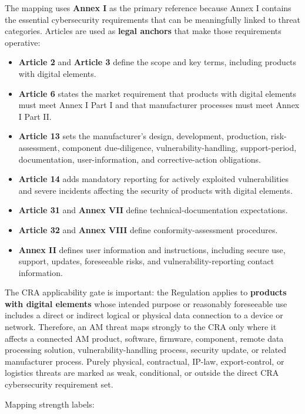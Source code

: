 \documentclass[10pt,a4paper,oneside]{report}
\begin{document}
The mapping uses \textbf{Annex I} as the primary reference because Annex I contains the essential cybersecurity requirements that can be meaningfully linked to threat categories. Articles are used as \textbf{legal anchors} that make those requirements operative:

\begin{itemize}
\item \textbf{Article 2} and \textbf{Article 3} define the scope and key terms, including products with digital elements.
\item \textbf{Article 6} states the market requirement that products with digital elements must meet Annex I Part I and that manufacturer processes must meet Annex I Part II.
\item \textbf{Article 13} sets the manufacturer's design, development, production, risk-assessment, component due-diligence, vulnerability-handling, support-period, documentation, user-information, and corrective-action obligations.
\item \textbf{Article 14} adds mandatory reporting for actively exploited vulnerabilities and severe incidents affecting the security of products with digital elements.
\item \textbf{Article 31} and \textbf{Annex VII} define technical-documentation expectations.
\item \textbf{Article 32} and \textbf{Annex VIII} define conformity-assessment procedures.
\item \textbf{Annex II} defines user information and instructions, including secure use, support, updates, foreseeable risks, and vulnerability-reporting contact information.
\end{itemize}

The CRA applicability gate is important: the Regulation applies to \textbf{products with digital elements} whose intended purpose or reasonably foreseeable use includes a direct or indirect logical or physical data connection to a device or network. Therefore, an AM threat maps strongly to the CRA only where it affects a connected AM product, software, firmware, component, remote data processing solution, vulnerability-handling process, security update, or related manufacturer process. Purely physical, contractual, IP-law, export-control, or logistics threats are marked as weak, conditional, or outside the direct CRA cybersecurity requirement set.

Mapping strength labels:
\end{document}
